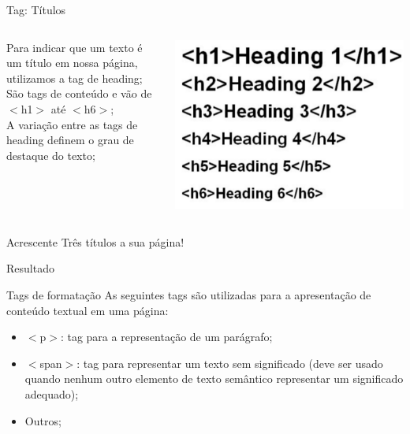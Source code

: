 \documentclass{beamer}
\begin{document}
\begin{frame}{Tag: Títulos}
  \begin{columns}
    \begin{column}{0.5\textwidth}
      Para indicar que um texto é um título em nossa página,
utilizamos a tag de heading;\\

      São tags de conteúdo e vão de $<$h1$>$ até $<$h6$>$;\\
 
    A variação entre as tags de heading definem o grau de destaque do texto;
   \end{column}
   \begin{column}{0.4\textwidth}
    \begin{center}
      \includegraphics[height=0.4\paperheight]{fig/aula1/heading.png} \\
    \end{center}
   \end{column}
  \end{columns}
  
  Acrescente Três títulos a sua página!
\end{frame}
\begin{frame}{Resultado}
  \begin{center}
    
  \end{center}
\end{frame}
\begin{frame}{Tags de formatação}
 As seguintes tags são utilizadas para a apresentação de conteúdo textual em 
uma 
página:
\begin{itemize}
 \item $<$p$>$: tag para a representação de um parágrafo;
  \item $<$span$>$: tag para representar um texto sem significado (deve 
ser usado quando nenhum outro elemento de texto semântico representar um 
significado adequado);
   \item Outros;
\end{itemize}
\end{frame}
\end{document}
